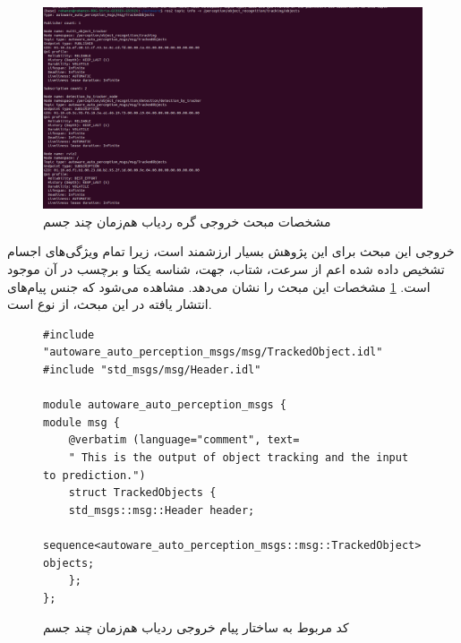 \begin{figure}[h!]
    \centering
    \includegraphics[width=1\linewidth]{figures/Tracked_Objects_Topic_Info.png}
    \caption{مشخصات مبحث خروجی گره‌ ردیاب هم‌زمان چند جسم}
    \label{fig:Tracked_Objects_Topic_Info}
\end{figure}

خروجی این مبحث برای این پژوهش بسیار ارزشمند است، زیرا تمام ویژگی‌های اجسام تشخیص داده شده اعم از سرعت، شتاب، جهت، شناسه یکتا و برچسب در آن موجود است. \cref{fig:Tracked_Objects_Topic_Info} مشخصات این مبحث را نشان می‌دهد. مشاهده می‌شود که جنس پیام‌های انتشار یافته در این مبحث، از نوع  است.

\begin{figure}
    \centering
    \begin{latin}
        \begin{lstlisting}[style=code]
#include "autoware_auto_perception_msgs/msg/TrackedObject.idl"
#include "std_msgs/msg/Header.idl"
        
module autoware_auto_perception_msgs {
module msg {
    @verbatim (language="comment", text=
    " This is the output of object tracking and the input to prediction.")
    struct TrackedObjects {
    std_msgs::msg::Header header;
    sequence<autoware_auto_perception_msgs::msg::TrackedObject> objects;
    };
};
        \end{lstlisting}
    \end{latin}
    \caption{کد مربوط به ساختار پیام خروجی ردیاب هم‌زمان چند جسم}
    \label{fig:Tracked_Objects_Code}
\end{figure}

